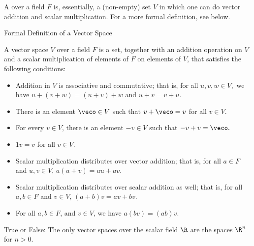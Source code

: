 A {} over a field $F$ is, essentially, a (non-empty) set $V$ in which one can 
do vector addition and scalar multiplication.  For a more formal definition, see below. 

\begin{edXshowhide}{Formal Definition of a Vector Space}


A vector space $V$ over a field $F$ is a set, together with an addition operation on $V$
and a scalar multiplication  of elements of $F$ on elements of $V$, that satisfies
the following conditions:

\begin{itemize}
\item Addition in $V$ is associative and commutative; that is, for all $u,v,w \in V,$ we have
$u+(v+w) = (u+v)+w$ and $u+v  = v+u.$  
\item There is an element $\veco \in V$ such that $v+\veco = v$ for all $v \in V.$
\item For every $v\in V$, there is an element $-v \in V$ such that $-v + v = \veco.$  
\item $1v = v$ for all $v \in V.$  
\item Scalar multiplication distributes over vector addition; that is, for all $a \in F$ and $u,v \in V$, $a(u+v) = au + av.$  
\item Scalar multiplication distributes over scalar addition as well; that is, for all $a,b \in F$ and $v \in V$, $(a+b)v = av + bv.$  
\item For all $a,b \in F$, and $v\in V$, we have $a(bv) = (ab)v.$  
\end{itemize}

\end{edXshowhide}




\endedxtext



True or False: The only vector spaces over the scalar field $\R$ are the spaces
$\R^n$ for $n> 0$.  



\endedxproblem


\endedxvertical

